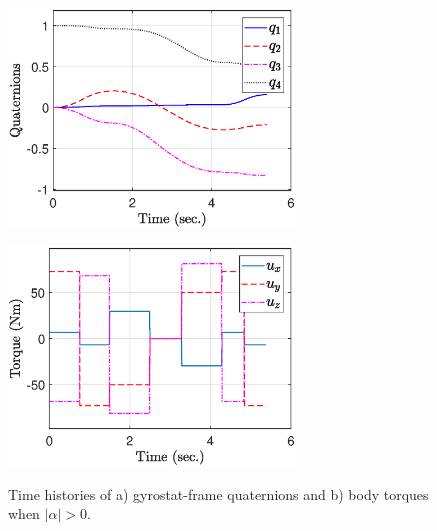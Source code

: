 \documentclass[journal ]{new-aiaa}
\begin{document}
\begin{figure}[htb!]
    \centering
    \begin{minipage}{.5\textwidth}
        \centering
\includegraphics[width=3in]{figures/alphaNot0/quats_phi_total.eps}
        \label{fig:prob1_6_2}
    \end{minipage}%
    \begin{minipage}{0.5\textwidth}
        \centering
   \includegraphics[width=3in]{figures/alphaNot0/torque_total.eps}
        \label{fig:prob1_6_1}
    \end{minipage}
    \caption{Time histories of a) gyrostat-frame quaternions and b) body torques when $|\alpha|>0$.}
    \label{fig:quats_phi_total}
	\end{figure}
	
\end{document}
